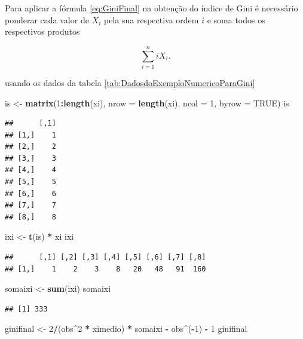 \documentclass[
]{book}
\newenvironment{Shaded}{\begin{snugshade}}{\end{snugshade}}
\newcommand{\DataTypeTok}[1]{\textcolor[rgb]{0.13,0.29,0.53}{#1}}
\newcommand{\DecValTok}[1]{\textcolor[rgb]{0.00,0.00,0.81}{#1}}
\newcommand{\KeywordTok}[1]{\textcolor[rgb]{0.13,0.29,0.53}{\textbf{#1}}}
\newcommand{\NormalTok}[1]{#1}
\newcommand{\OperatorTok}[1]{\textcolor[rgb]{0.81,0.36,0.00}{\textbf{#1}}}
\newcommand{\OtherTok}[1]{\textcolor[rgb]{0.56,0.35,0.01}{#1}}
\newcommand{\StringTok}[1]{\textcolor[rgb]{0.31,0.60,0.02}{#1}}
\begin{document}
Para aplicar a fórmula \eqref{eq:GiniFinal} na obtenção do índice de Gini é necessário ponderar cada valor de \(X_i\) pela sua respectiva ordem \(i\) e soma todos os respectivos produtos

\[
  \sum_{i=1}^{n}iX_i.
\]

usando os dados da tabela \ref{tab:DadosdoExemploNumericoParaGini}

\begin{Shaded}
\begin{Highlighting}[]
\NormalTok{is <-}\StringTok{ }\KeywordTok{matrix}\NormalTok{(}\DecValTok{1}\OperatorTok{:}\KeywordTok{length}\NormalTok{(xi), }\DataTypeTok{nrow =} \KeywordTok{length}\NormalTok{(xi), }\DataTypeTok{ncol =} \DecValTok{1}\NormalTok{, }
    \DataTypeTok{byrow =} \OtherTok{TRUE}\NormalTok{)}
\NormalTok{is}
\end{Highlighting}
\end{Shaded}

\begin{verbatim}
##      [,1]
## [1,]    1
## [2,]    2
## [3,]    3
## [4,]    4
## [5,]    5
## [6,]    6
## [7,]    7
## [8,]    8
\end{verbatim}

\begin{Shaded}
\begin{Highlighting}[]
\NormalTok{ixi <-}\StringTok{ }\KeywordTok{t}\NormalTok{(is) }\OperatorTok{*}\StringTok{ }\NormalTok{xi}
\NormalTok{ixi}
\end{Highlighting}
\end{Shaded}

\begin{verbatim}
##      [,1] [,2] [,3] [,4] [,5] [,6] [,7] [,8]
## [1,]    1    2    3    8   20   48   91  160
\end{verbatim}

\begin{Shaded}
\begin{Highlighting}[]
\NormalTok{somaixi <-}\StringTok{ }\KeywordTok{sum}\NormalTok{(ixi)}
\NormalTok{somaixi}
\end{Highlighting}
\end{Shaded}

\begin{verbatim}
## [1] 333
\end{verbatim}

\begin{Shaded}
\begin{Highlighting}[]
\NormalTok{ginifinal <-}\StringTok{ }\DecValTok{2}\OperatorTok{/}\NormalTok{(obs}\OperatorTok{^}\DecValTok{2} \OperatorTok{*}\StringTok{ }\NormalTok{ximedio) }\OperatorTok{*}\StringTok{ }\NormalTok{somaixi }\OperatorTok{-}\StringTok{ }\NormalTok{obs}\OperatorTok{^}\NormalTok{(}\OperatorTok{-}\DecValTok{1}\NormalTok{) }\OperatorTok{-}\StringTok{ }
\StringTok{    }\DecValTok{1}
\NormalTok{ginifinal}
\end{Highlighting}
\end{Shaded}
\end{document}

